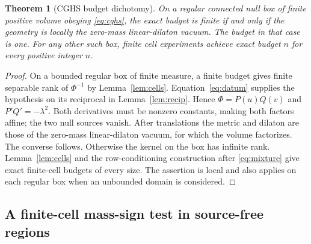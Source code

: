 \documentclass[11pt,letterpaper]{article}
\newtheorem{theorem}{Theorem}
\begin{document}
\begin{theorem}[CGHS budget dichotomy]\label{th:cghs}
On a regular connected null box of finite positive volume obeying \eqref{eq:cghs}, the exact budget is finite if and only if the geometry is locally the zero-mass linear-dilaton vacuum. The budget in that case is one. For any other such box, finite cell experiments achieve exact budget $n$ for every positive integer $n$.
\end{theorem}
\begin{proof}
On a bounded regular box of finite measure, a finite budget gives finite separable rank of $\Phi^{-1}$ by Lemma~\ref{lem:cells}. Equation~\eqref{eq:datum} supplies the hypothesis on its reciprocal in Lemma~\ref{lem:recip}. Hence $\Phi=P(u)Q(v)$ and $P'Q'=-\lambda^2$. Both derivatives must be nonzero constants, making both factors affine; the two null sources vanish. After translations the metric and dilaton are those of the zero-mass linear-dilaton vacuum, for which the volume factorizes. The converse follows. Otherwise the kernel on the box has infinite rank. Lemma~\ref{lem:cells} and the row-conditioning construction after \eqref{eq:mixture} give exact finite-cell budgets of every size. The assertion is local and also applies on each regular box when an unbounded domain is considered.
\end{proof}

\subsection{A finite-cell mass-sign test in source-free regions}
\end{document}
